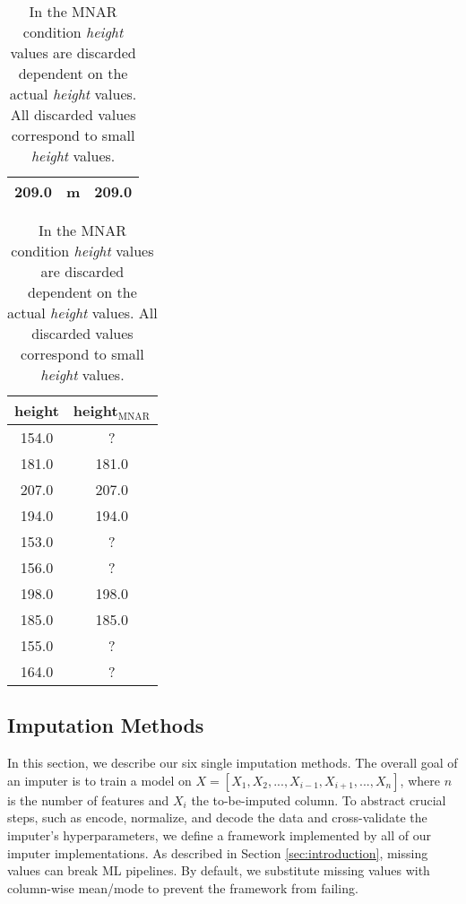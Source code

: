 \begin{table}
\begin{minipage}{0.3\textwidth}
\begin{tabular}{ccc}
  209.0 &      m &                209.0 \\
\bottomrule
\end{tabular}
\caption{In the MAR condition \textit{height} values are discarded dependent on values in another column,  here \textit{gender}. All discarded \textit{height} values correspond to rows in which \textit{gender} was \textit{male}.
}
	\label{tab:missingness_patterns_MAR}
\end{minipage}
\hfill
\begin{minipage}{0.28\textwidth}
\centering
	\begin{tabular}{cc}
\toprule
 height &  height$_{\text{MNAR}}$ \\
\midrule
  154.0 &                     ? \\
  181.0 &                 181.0 \\
  207.0 &                 207.0 \\
  194.0 &                 194.0 \\
  153.0 &                     ? \\
  156.0 &                     ? \\
  198.0 &                 198.0 \\
  185.0 &                 185.0 \\
  155.0 &                     ? \\
  164.0 &                     ? \\
\bottomrule
\end{tabular}
\caption{In the MNAR condition \textit{height} values are discarded dependent on the actual \textit{height} values. All discarded values correspond to small \textit{height} values.
}
	\label{tab:missingness_patterns_MNAR}
\vspace{1em}
\end{minipage}

\end{table}


\subsection{Imputation Methods}
%
In this section, we describe our six single imputation methods. The overall goal of an imputer is to train a model on $X = [X_1, X_2, ..., X_{i-1}, X_{i+1}, ..., X_n]$, where $n$ is the number of features and $X_i$ the to-be-imputed column. To abstract crucial steps, such as encode, normalize, and decode the data and cross-validate the imputer's hyperparameters, we define a framework implemented by all of our imputer implementations. As described in Section \ref{sec:introduction}, missing values can break ML pipelines. By default, we substitute missing values with column-wise mean/mode to prevent the framework from failing.

